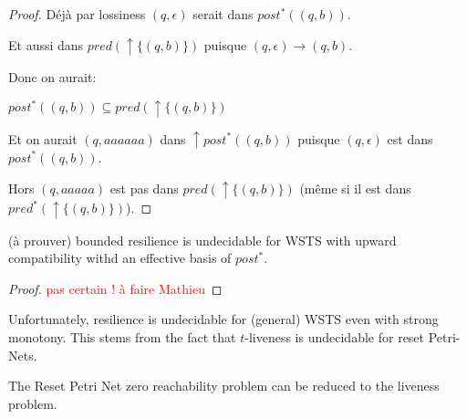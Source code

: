 \begin{proof}
{Déjà par lossiness $(q,\epsilon)$ serait dans $post^*((q,b))$.

Et aussi dans $pred(\uparrow \{ (q,b)\})$ puisque $(q,\epsilon) \to (q,b)$.

Donc on aurait:

$post^*((q,b))  \subseteq pred(\uparrow \{ (q,b)\})$

Et on aurait $(q,aaaaaa)$ dans 
$\uparrow post^* ((q,b))$ puisque $(q,\epsilon)$ est dans $post^* ((q,b))$.

Hors $(q,aaaaa)$ est pas dans $pred(\uparrow \{ (q,b)\})$
(même si il est dans $pred^*(\uparrow \{ (q,b)\})$).



}
 
 
 
 
\end{proof}

\begin{proposition}(à prouver)
{\sc bounded resilience} is undecidable for WSTS with upward compatibility withd an effective basis of $post^*$.
\end{proposition}

\begin{proof}
 \textcolor{red}{pas certain ! à faire Mathieu}
\end{proof}

%
%
%



Unfortunately, resilience is undecidable for (general) WSTS even with strong monotony.
This stems from the fact that $t$-liveness is undecidable for reset Petri-Nets.


\begin{theorem}
The  Reset Petri Net zero reachability problem can be reduced to the liveness problem.
\end{theorem}

